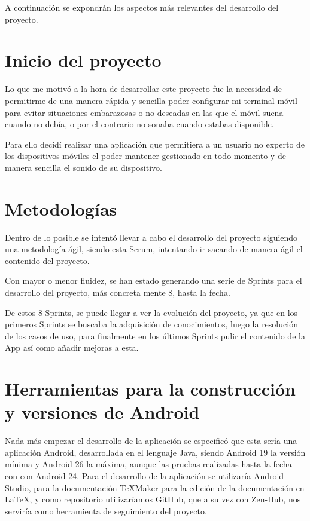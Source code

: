 A continuación se expondrán los aspectos más relevantes del desarrollo del proyecto.

\section{Inicio del proyecto}
Lo que me motivó a la hora de desarrollar este proyecto fue la necesidad de permitirme de una manera rápida y sencilla poder configurar mi terminal móvil para evitar situaciones embarazosas o no deseadas en las que el móvil suena cuando no debía, o por el contrario no sonaba cuando estabas disponible.

Para ello decidí realizar una aplicación que permitiera a un usuario no experto de los dispositivos móviles el poder mantener gestionado en todo momento y de manera sencilla el sonido de su dispositivo.

\section{Metodologías}
Dentro de lo posible se intentó llevar a cabo el desarrollo del proyecto siguiendo una metodología ágil, siendo esta Scrum, intentando ir sacando de manera ágil el contenido del proyecto.

Con mayor o menor fluidez, se han estado generando una serie de Sprints para el desarrollo del proyecto, más concreta mente 8, hasta la fecha.

De estos 8 Sprints, se puede llegar a ver la evolución del proyecto, ya que en los primeros Sprints se buscaba la adquisición de conocimientos, luego la resolución de los casos de uso, para finalmente en los últimos Sprints pulir el contenido de la App así como añadir mejoras a esta.

\section{Herramientas para la construcción y versiones de Android}
Nada más empezar el desarrollo de la aplicación se especificó que esta sería una aplicación Android, desarrollada en el lenguaje Java, siendo Android 19 la versión mínima y Android 26 la máxima, aunque las pruebas realizadas hasta la fecha con con Android 24.
Para el desarrollo de la aplicación se utilizaría Android Studio, para la documentación \TeX{}Maker para la edición de la documentación en La\TeX{}, y como repositorio utilizaríamos GitHub, que a su vez con Zen-Hub, nos serviría como herramienta de seguimiento del proyecto.

